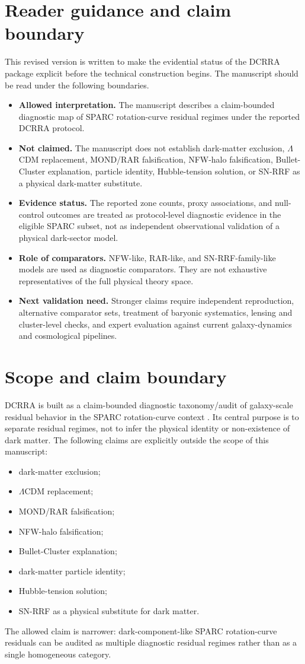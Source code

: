 \documentclass[11pt,a4paper]{article}
\begin{document}
\section*{Reader guidance and claim boundary}
This revised version is written to make the evidential status of the DCRRA package explicit before the technical construction begins. The manuscript should be read under the following boundaries.
\begin{itemize}
\item \textbf{Allowed interpretation.} The manuscript describes a claim-bounded diagnostic map of SPARC rotation-curve residual regimes under the reported DCRRA protocol.
\item \textbf{Not claimed.} The manuscript does not establish dark-matter exclusion, $\Lambda$CDM replacement, MOND/RAR falsification, NFW-halo falsification, Bullet-Cluster explanation, particle identity, Hubble-tension solution, or SN-RRF as a physical dark-matter substitute.
\item \textbf{Evidence status.} The reported zone counts, proxy associations, and null-control outcomes are treated as protocol-level diagnostic evidence in the eligible SPARC subset, not as independent observational validation of a physical dark-sector model.
\item \textbf{Role of comparators.} NFW-like, RAR-like, and SN-RRF-family-like models are used as diagnostic comparators. They are not exhaustive representatives of the full physical theory space.
\item \textbf{Next validation need.} Stronger claims require independent reproduction, alternative comparator sets, treatment of baryonic systematics, lensing and cluster-level checks, and expert evaluation against current galaxy-dynamics and cosmological pipelines.
\end{itemize}

\section{Scope and claim boundary}
DCRRA is built as a claim-bounded diagnostic taxonomy/audit of galaxy-scale residual behavior in the SPARC rotation-curve context \cite{lelli2016}. Its central purpose is to separate residual regimes, not to infer the physical identity or non-existence of dark matter. The following claims are explicitly outside the scope of this manuscript:
\begin{itemize}
\item dark-matter exclusion;
\item $\Lambda$CDM replacement;
\item MOND/RAR falsification;
\item NFW-halo falsification;
\item Bullet-Cluster explanation;
\item dark-matter particle identity;
\item Hubble-tension solution;
\item SN-RRF as a physical substitute for dark matter.
\end{itemize}
The allowed claim is narrower: dark-component-like SPARC rotation-curve residuals can be audited as multiple diagnostic residual regimes rather than as a single homogeneous category.
\end{document}
